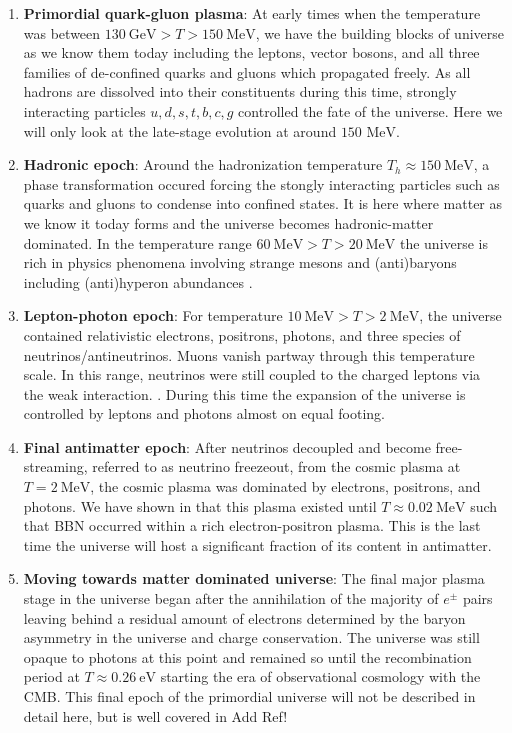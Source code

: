 \documentclass[Universe,article,submit,moreauthors,pdftex]{Definitions/mdpi}
\newcommand{\MeV}{\text{ MeV}}
\newcommand*{\xred}{\color{red}}
\begin{document}
\begin{enumerate}
  \item \textbf{Primordial quark-gluon plasma}: At early times when the temperature was between $130\ \mathrm{GeV}>T>150\ \mathrm{MeV}$, we have the building blocks of universe as we know them today including the leptons, vector bosons, and all three families of de-confined quarks and gluons which propagated freely. As all hadrons are dissolved into their constituents during this time, strongly interacting particles $u,d,s,t,b,c,g$ controlled the fate of the universe. Here we will only look at the late-stage evolution at around $150\MeV$.
  \item \textbf{Hadronic epoch}: Around the hadronization temperature $T_h\approx150\ \mathrm{MeV}$, a phase transformation occured forcing the stongly interacting particles such as quarks and gluons to condense into confined states. It is here where matter as we know it today forms and the universe becomes hadronic-matter dominated. In the temperature range $ 60\ \mathrm{MeV}>T>20\ \mathrm{MeV}$ the universe is rich in physics phenomena involving strange mesons and (anti)baryons including (anti)hyperon abundances \cite{Fromerth:2012fe,Yang:2021bko}.
  \item  \textbf{Lepton-photon epoch}: For temperature $10\ \mathrm{MeV}>T>2\ \mathrm{MeV}$, the universe contained relativistic electrons, positrons, photons, and three species of neutrinos/antineutrinos. Muons vanish partway through this temperature scale. In this range, neutrinos were still coupled to the charged leptons via the weak interaction. \cite{Birrell:2012gg}. During this time the expansion of the universe is controlled by leptons and photons almost on equal footing.
  \item  \textbf{Final antimatter epoch}: After neutrinos decoupled and become free-streaming, referred to as neutrino freezeout, from the cosmic plasma at $T=2\ \mathrm{MeV}$, the cosmic plasma was dominated by electrons, positrons, and photons. We have shown in \cite{Chris:2023abc} that this plasma existed until $T\approx0.02\ \mathrm{MeV}$ such that BBN occurred within a rich electron-positron plasma. This is the last time the universe will host a significant fraction of its content in antimatter.
  \item \textbf{Moving towards matter dominated universe}: The final major plasma stage in the universe began after the annihilation of the majority of $e^{\pm}$ pairs leaving behind a residual amount of electrons determined by the baryon asymmetry in the universe and charge conservation. The universe was still opaque to photons at this point and remained so until the recombination period at $T\approx0.26\ \mathrm{eV}$ starting the era of observational cosmology with the CMB. This final epoch of the primordial universe will not be described in detail here, but is well covered in {\xred Add Ref!}
\end{enumerate}
\end{document}
